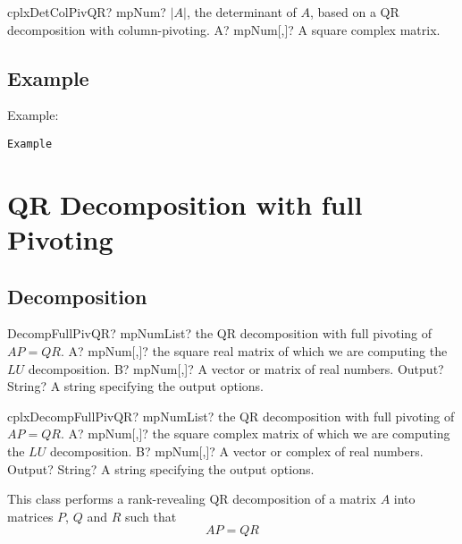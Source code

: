 \vspace{0.6cm}
\begin{mpFunctionsExtract}
	\mpFunctionOne
	{cplxDetColPivQR? mpNum? $|A|$, the determinant of $A$, based on a QR decomposition with column-pivoting.}
	{A? mpNum[,]? A square complex matrix.}
\end{mpFunctionsExtract}




\subsection{Example}
Example:
\begin{verbatim}
Example
\end{verbatim}




\newpage
\section{QR Decomposition with full Pivoting}
\label{QR Decomposition with full Pivoting}

\subsection{Decomposition}

\begin{mpFunctionsExtract}
	\mpFunctionThree
	{DecompFullPivQR? mpNumList? the QR decomposition with full pivoting of $AP = QR$.}
	{A? mpNum[,]? the square real matrix of which we are computing the $LU$ decomposition.}
	{B? mpNum[,]? A vector or matrix of real numbers.}
	{Output? String? A string specifying the output options.}
\end{mpFunctionsExtract}

\vspace{0.6cm}
\begin{mpFunctionsExtract}
	\mpFunctionThree
	{cplxDecompFullPivQR? mpNumList? the QR decomposition with full pivoting of $AP = QR$.}
	{A? mpNum[,]? the square complex matrix of which we are computing the $LU$ decomposition.}
	{B? mpNum[,]? A vector or complex of real numbers.}
	{Output? String? A string specifying the output options.}
\end{mpFunctionsExtract}



\vspace{0.3cm}

This class performs a rank-revealing QR decomposition of a matrix $A$ into matrices $P$, $Q$ and $R$ such that 
\begin{equation}
AP=QR
\end{equation} 

